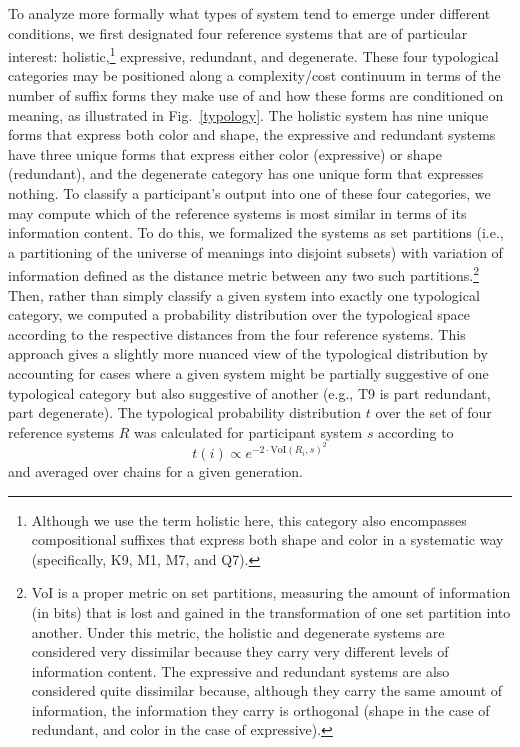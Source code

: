 \documentclass[doc,biblatex]{apa7}
\begin{document}
To analyze more formally what types of system tend to emerge under different conditions, we first designated four reference systems that are of particular interest: holistic,\footnote{Although we use the term holistic here, this category also encompasses compositional suffixes that express both shape and color in a systematic way (specifically, K9, M1, M7, and Q7).} expressive, redundant, and degenerate. These four typological categories may be positioned along a complexity/cost continuum in terms of the number of suffix forms they make use of and how these forms are conditioned on meaning, as illustrated in Fig.~\ref{typology}. The holistic system has nine unique forms that express both color and shape, the expressive and redundant systems have three unique forms that express either color (expressive) or shape (redundant), and the degenerate category has one unique form that expresses nothing. To classify a participant's output into one of these four categories, we may compute which of the reference systems is most similar in terms of its information content. To do this, we formalized the systems as set partitions (i.e., a partitioning of the universe of meanings into disjoint subsets) with variation of information \parencite[VoI;][]{Meila:2007} defined as the distance metric between any two such partitions.\footnote{VoI is a proper metric on set partitions, measuring the amount of information (in bits) that is lost and gained in the transformation of one set partition into another. Under this metric, the holistic and degenerate systems are considered very dissimilar because they carry very different levels of information content. The expressive and redundant systems are also considered quite dissimilar because, although they carry the same amount of information, the information they carry is orthogonal (shape in the case of redundant, and color in the case of expressive).} Then, rather than simply classify a given system into exactly one typological category, we computed a probability distribution over the typological space according to the respective distances from the four reference systems. This approach gives a slightly more nuanced view of the typological distribution by accounting for cases where a given system might be partially suggestive of one typological category but also suggestive of another (e.g., T9 is part redundant, part degenerate). The typological probability distribution $t$ over the set of four reference systems $R$ was calculated for participant system $s$ according to%
\begin{equation}
	t(i) \propto e^{-2 \cdot \mathrm{VoI}(R_i, s)^2}
\end{equation}
and averaged over chains for a given generation.
\end{document}
